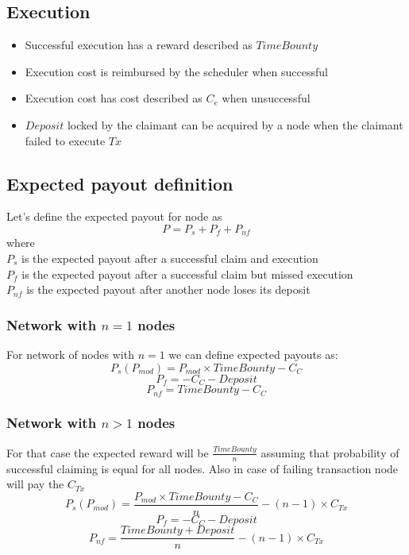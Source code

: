\documentclass{report}
\begin{document}
\begin{appendices}
  \subsection{Execution}
  \begin{itemize}
  \item Successful execution has a reward described as $TimeBounty$
  \item Execution cost is reimbursed by the scheduler when successful
  \item Execution cost has cost described as $C_{e}$ when unsuccessful
  \item $Deposit$ locked by the claimant can be acquired by a node when the claimant failed to execute $Tx$
  \end{itemize}

  \subsection{Expected payout definition}
  Let's define the expected payout for node as
  \[
  P=P_{s}+P_{f}+P_{nf}
  \]
  where
  \\

  $P_{s}$ is the expected payout after a successful claim and execution
  \\

  $P_{f}$ is the expected payout after a successful claim but missed execution
  \\

  $P_{nf}$ is the expected payout after another node loses its deposit
  \\

  \subsubsection{Network with $n=1$ nodes}
  For network of nodes with $n=1$ we can define expected payouts as:
  \[
  P_{s}(P_{mod})=P_{mod} \times TimeBounty-C_{C}
  \]
  \[
  P_{f}=-C_{C}-Deposit
  \]
  \[
  P_{nf}=TimeBounty-C_{C}
  \]
  \subsubsection{Network with $n>1$ nodes}
  For that case the expected reward will be $\frac{TimeBounty}{n}$ assuming that probability of successful claiming is equal for all nodes. Also in case of failing transaction node will pay the $C_{Tx}$
  \[
  P_{s}(P_{mod})=\frac{P_{mod} \times TimeBounty-C_{C}}{n} - (n-1) \times C_{Tx}
  \]
  \[
  P_{f}=-C_{C}-Deposit
  \]
  \[
  P_{nf}=\frac{TimeBounty+Deposit}{n} - (n-1) \times C_{Tx}
  \]


\end{appendices}
\end{document}
